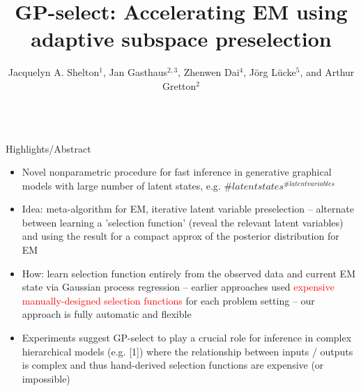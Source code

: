 \documentclass[final]{beamer}
\title[]{\huge GP-select: Accelerating EM using adaptive subspace preselection}
\author[Shelton, Gasthaus, Dai, L\"{u}cke, \& Gretton]{\Large Jacquelyn A. Shelton$^{ 1}$,  Jan Gasthaus$^{ 2,3}$, Zhenwen Dai$^{ 4}$, J\"org L\"{u}cke$^{ 5}$, and  Arthur Gretton$^{ 2}$}
\institute[TU]{\large $^{ 1}$Technical University Berlin,\quad 
$^{ 2}$UCL Gatsby and CSML,\quad 
$^{ 3}$Amazon,\quad 
$^{ 4}$University of Sheffield,\quad 
$^{ 5}$University of Oldenburg}
\newcommand{\highlight}[1]{\textcolor{blocktbgn}{#1}}
\begin{document}
\begin{frame}{} 
  \begin{columns}[t]
  \begin{column}{.33\linewidth}

    \begin{block}{Highlights/Abstract}%
            \vspace{-.4cm}  
            \begin{itemize}
            \setlength{\labelsep}{0.5em}
            \item Novel nonparametric procedure for \highlight{fast inference} in \highlight{generative graphical models with large number of latent states}, e.g. $\# latent states^{\# latent variables}$ %
            \item \highlight{Idea}: meta-algorithm for EM, \highlight{iterative latent variable preselection} -- alternate between learning a \highlight{'selection function'} (reveal the relevant latent variables) and using the result for a \highlight{compact approx of the posterior distribution for EM}
            \item \highlight{How}: \textcolor{dg}{learn selection function} entirely from the observed data and current EM state via \highlight{Gaussian process regression} -- earlier approaches used \textcolor{red}{expensive manually-designed selection functions} for each problem setting -- our approach is \textcolor{dg}{fully automatic and flexible}
            \item \highlight{Experiments} suggest GP-select to play a \textcolor{dg}{crucial role} for inference in complex hierarchical models (e.g. [1]) where the \textcolor{dg}{relationship between inputs / outputs is complex} and thus hand-derived selection functions are expensive (or impossible) %
            \end{itemize}




\end{block}
\end{column}
\end{columns}
\end{frame}
\end{document}

